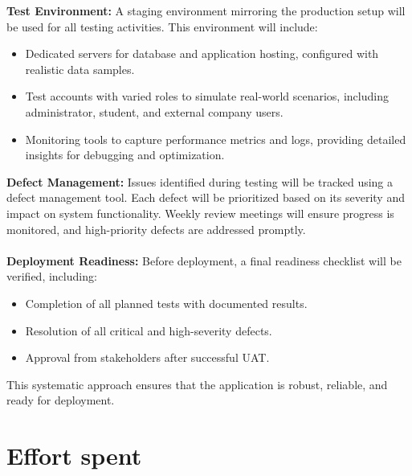 \documentclass[11pt,twoside]{article}
\begin{document}
\textbf{Test Environment:} A staging environment mirroring the production setup will be used for all testing activities. This environment will include:

\begin{itemize}
\item Dedicated servers for database and application hosting, configured with realistic data samples.
\item Test accounts with varied roles to simulate real-world scenarios, including administrator, student, and external company users.
\item Monitoring tools to capture performance metrics and logs, providing detailed insights for debugging and optimization.
\end{itemize}

\textbf{Defect Management:} Issues identified during testing will be tracked using a defect management tool. Each defect will be prioritized based on its severity and impact on system functionality. Weekly review meetings will ensure progress is monitored, and high-priority defects are addressed promptly. \\ \\

\textbf{Deployment Readiness:} Before deployment, a final readiness checklist will be verified, including:
\begin{itemize}
    \item Completion of all planned tests with documented results.
    \item Resolution of all critical and high-severity defects.
    \item Approval from stakeholders after successful UAT.
\end{itemize}

This systematic approach ensures that the application is robust, reliable, and ready for deployment.

	
\newpage

\section{Effort spent}
\end{document}
